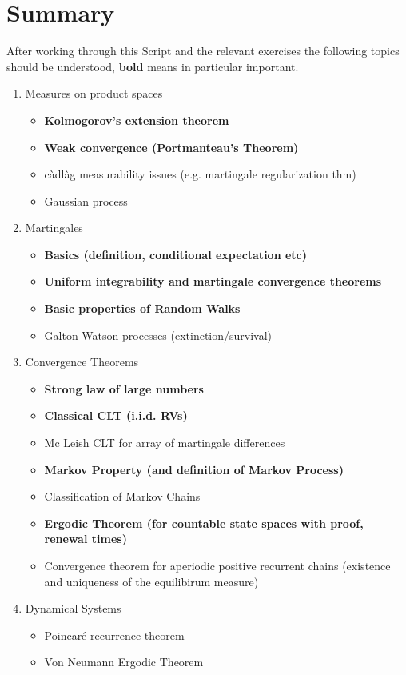 \documentclass[11pt,a4paper, final]{article}
\theoremstyle{definition}
\begin{document}
\section{Summary}
After working through this Script and the relevant exercises the following topics should be understood, \textbf{bold} means in particular important. 
\begin{enumerate}
\item Measures on product spaces
\begin{itemize}
\item \textbf{Kolmogorov's extension theorem}
\item \textbf{Weak convergence (Portmanteau's Theorem)}
\item càdlàg measurability issues (e.g. martingale regularization thm)
\item Gaussian process 
\end{itemize}
\item Martingales
\begin{itemize}
\item \textbf{Basics (definition, conditional expectation etc)}
\item \textbf{Uniform integrability and martingale convergence theorems}
\item \textbf{Basic properties of Random Walks}
\item Galton-Watson processes (extinction/survival)
\end{itemize}
\item Convergence Theorems
\begin{itemize}
\item \textbf{Strong law of large numbers}
\item \textbf{Classical CLT (i.i.d. RVs)}
\item Mc Leish CLT for array of martingale differences
\item \textbf{Markov Property (and definition of Markov Process)}
\item Classification of Markov Chains
\item \textbf{Ergodic Theorem (for countable state spaces with proof, renewal times)}
\item Convergence theorem for aperiodic positive recurrent chains (existence and uniqueness of the equilibirum measure)
\end{itemize}
\item Dynamical Systems
\begin{itemize}
\item Poincaré recurrence theorem
\item Von Neumann Ergodic Theorem

\end{itemize}
\end{enumerate}
\end{document}
